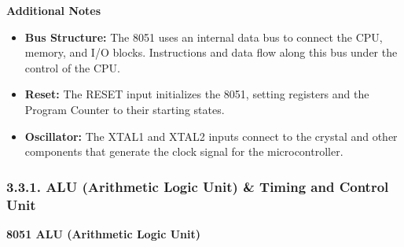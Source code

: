 \documentclass[
]{article}
\begin{document}
\textbf{Additional Notes}

\begin{itemize}
\item
  \textbf{Bus Structure:} The 8051 uses an internal data bus to connect
  the CPU, memory, and I/O blocks. Instructions and data flow along this
  bus under the control of the CPU.
\item
  \textbf{Reset:} The RESET input initializes the 8051, setting
  registers and the Program Counter to their starting states.
\item
  \textbf{Oscillator:} The XTAL1 and XTAL2 inputs connect to the crystal
  and other components that generate the clock signal for the
  microcontroller.
\end{itemize}

\hypertarget{331-alu-arithmetic-logic-unit--timing-and-control-unit}{%
\subsubsection{3.3.1. ALU (Arithmetic Logic Unit) \& Timing and Control
Unit}\label{331-alu-arithmetic-logic-unit--timing-and-control-unit}}

\textbf{8051 ALU (Arithmetic Logic Unit)}
\end{document}
